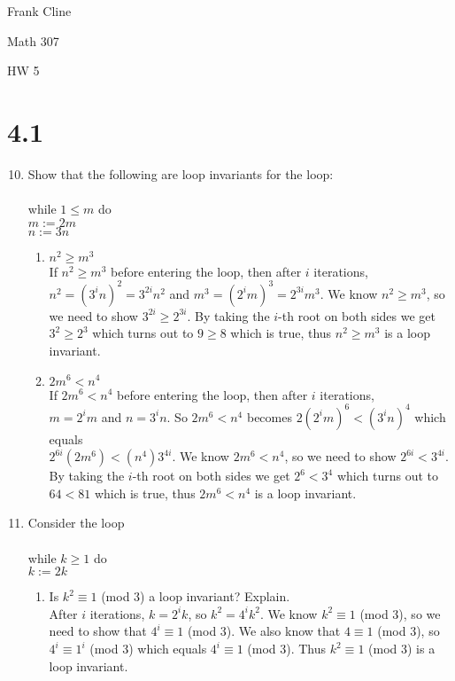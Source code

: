 \documentclass[12pt]{article}
\begin{document}
\onehalfspacing
\hfill Frank Cline

\hfill Math 307

\hfill HW 5


\section*{4.1}
\begin{enumerate}

\setcounter{enumi}{9}
\item Show that the following are loop invariants for the loop:\\ \\
while $1\leq m$ do \\
$m:=2m$\\
$n:=3n$
	\begin{enumerate}
	\item $n^2\geq m^3$\\
	If $n^2\geq m^3$ before entering the loop, then after $i$ iterations, \\
	$n^2=(3^in)^2=3^{2i}n^2$ and $m^3=(2^im)^3=2^{3i}m^3$. We know $n^2\geq m^3$, so we need to 
	show $3^{2i}\geq2^{3i}$. By taking the $i$-th root on both sides we get $3^2\geq2^3$ which turns out 	to $9\geq8$ which is true, thus $n^2\geq m^3$ is a loop invariant.
	
	\item $2m^6<n^4$\\
	If $2m^6<n^4$ before entering the loop, then after $i$ iterations, \\
	$m=2^i m$ and $n=3^i n$. So $2m^6<n^4$ becomes $2(2^im)^6<(3^in)^4$ which equals\\
	$2^{6i}(2m^6)<(n^4)3^{4i}$. We know $2m^6<n^4$, so we need to show $2^{6i}<3^{4i}$. 
	By taking the $i$-th root on both sides we get $2^6<3^4$ which turns out 	to $64<81$ which is 	true, 		thus $2m^6<n^4$ is a loop invariant.
	\end{enumerate}
	
\setcounter{enumi}{11}
\item Consider the loop\\ \\
while $k\geq 1$ do\\
$k:=2k$
	\begin{enumerate}
	\item Is $k^2\equiv 1$ (mod 3) a loop invariant? Explain.\\
	After $i$ iterations, $k=2^ik$, so $k^2 = 4^ik^2$. We know $k^2\equiv 1$ (mod 3), so we need to 		show that $4^i\equiv 1$ (mod 3). We also know that $4\equiv 1$ (mod 3), so $4^i\equiv 1^i$ (mod 3) 	which equals $4^i\equiv 1$ (mod 3). Thus $k^2\equiv 1$ (mod 3) is a loop invariant.
	

\end{enumerate}
\end{enumerate}
\end{document}
